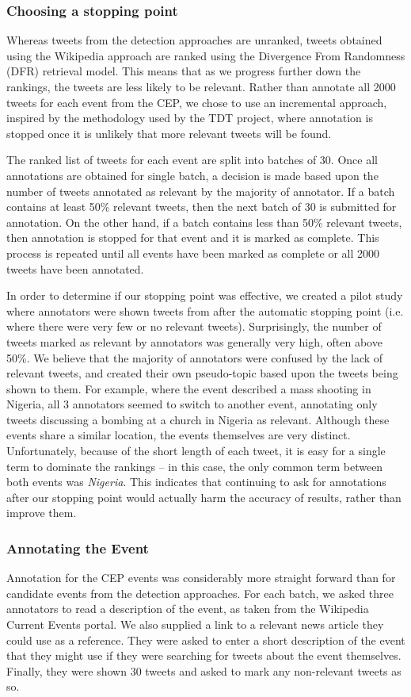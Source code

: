 \subsubsection{Choosing a stopping point}
Whereas tweets from the detection approaches are unranked, tweets obtained using the Wikipedia approach are ranked using the Divergence From Randomness (DFR) \citep{Amati02} retrieval model.
This means that as we progress further down the rankings, the tweets are less likely to be relevant.
Rather than annotate all 2000 tweets for each event from the CEP, we chose to use an incremental approach, inspired by the methodology used by the TDT project, where annotation is stopped once it is unlikely that more relevant tweets will be found.

The ranked list of tweets for each event are split into batches of 30.
Once all annotations are obtained for single batch, a decision is made based upon the number of tweets annotated as relevant by the majority of annotator.
If a batch contains at least 50\% relevant tweets, then the next batch of 30 is submitted for annotation.
On the other hand, if a batch contains less than 50\% relevant tweets, then annotation is stopped for that event and it is marked as complete.
This process is repeated until all events have been marked as complete or all 2000 tweets have been annotated.

In order to determine if our stopping point was effective, we created a pilot study where annotators were shown tweets from after the automatic stopping point (i.e. where there were very few or no relevant tweets).
Surprisingly, the number of tweets marked as relevant by annotators was generally very high, often above 50\%.
We believe that the majority of annotators were confused by the lack of relevant tweets, and created their own pseudo-topic based upon the tweets being shown to them.
For example, where the event described a mass shooting in Nigeria, all 3 annotators seemed to switch to another event, annotating only tweets discussing a bombing at a church in Nigeria as relevant.
Although these events share a similar location, the events themselves are very distinct.
Unfortunately, because of the short length of each tweet, it is easy for a single term to dominate the rankings -- in this case, the only common term between both events was \emph{Nigeria}.
This indicates that continuing to ask for annotations after our stopping point would actually harm the accuracy of results, rather than improve them.

\subsubsection{Annotating the Event}
Annotation for the CEP events was considerably more straight forward than for candidate events from the detection approaches.
For each batch, we asked three annotators to read a description of the event, as taken from the Wikipedia Current Events portal.
We also supplied a link to a relevant news article they could use as a reference.
They were asked to enter a short description of the event that they might use if they were searching for tweets about the event themselves.
Finally, they were shown 30 tweets and asked to mark any non-relevant tweets as so.

